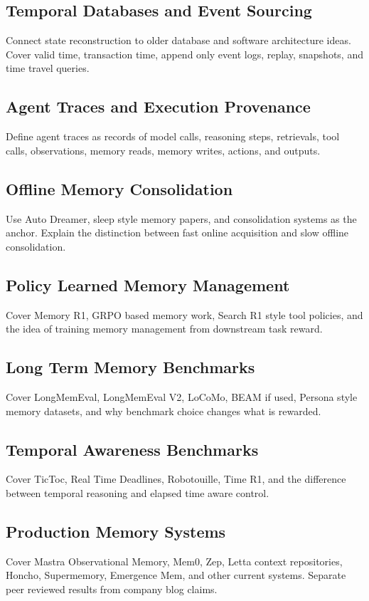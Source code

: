 \documentclass[11pt]{article}
\begin{document}
\subsection{Temporal Databases and Event Sourcing}
Connect state reconstruction to older database and software architecture ideas. Cover valid time, transaction time, append only event logs, replay, snapshots, and time travel queries.

\subsection{Agent Traces and Execution Provenance}
Define agent traces as records of model calls, reasoning steps, retrievals, tool calls, observations, memory reads, memory writes, actions, and outputs.

\subsection{Offline Memory Consolidation}
Use Auto Dreamer, sleep style memory papers, and consolidation systems as the anchor. Explain the distinction between fast online acquisition and slow offline consolidation.

\subsection{Policy Learned Memory Management}
Cover Memory R1, GRPO based memory work, Search R1 style tool policies, and the idea of training memory management from downstream task reward.

\subsection{Long Term Memory Benchmarks}
Cover LongMemEval, LongMemEval V2, LoCoMo, BEAM if used, Persona style memory datasets, and why benchmark choice changes what is rewarded.

\subsection{Temporal Awareness Benchmarks}
Cover TicToc, Real Time Deadlines, Robotouille, Time R1, and the difference between temporal reasoning and elapsed time aware control.

\subsection{Production Memory Systems}
Cover Mastra Observational Memory, Mem0, Zep, Letta context repositories, Honcho, Supermemory, Emergence Mem, and other current systems. Separate peer reviewed results from company blog claims.
\end{document}
